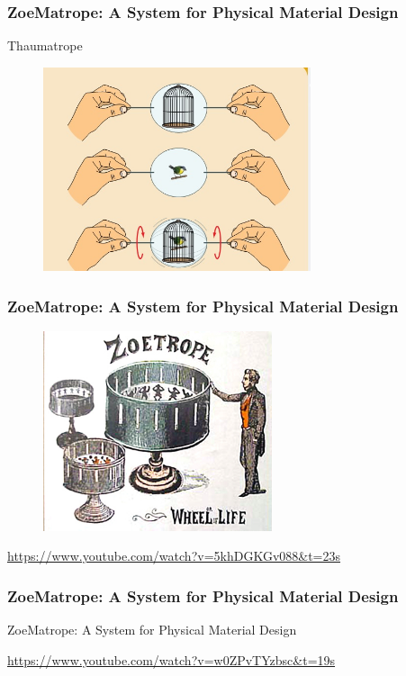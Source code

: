 \frame
{
	\frametitle{ZoeMatrope: A System for Physical Material Design}
	\centering
	Thaumatrope
	\begin{figure}
		\centering
		\includegraphics[width=0.7\textwidth]{img/zoematrope/thaumatrope.jpg}
	\end{figure}
	
}

\frame
{
	\frametitle{ZoeMatrope: A System for Physical Material Design}
	\begin{figure}
		\centering
		\includegraphics[width=0.6\textwidth]{img/zoematrope/zoetrope.jpg}
	\end{figure}
	
	\centering
	\url{https://www.youtube.com/watch?v=5khDGKGv088&t=23s}
}

\frame
{
	\frametitle{ZoeMatrope: A System for Physical Material Design}
	ZoeMatrope: A System for Physical Material Design \cite{Miyashita:2016}
	
	\centering
	\url{https://www.youtube.com/watch?v=w0ZPvTYzbsc&t=19s}
}

